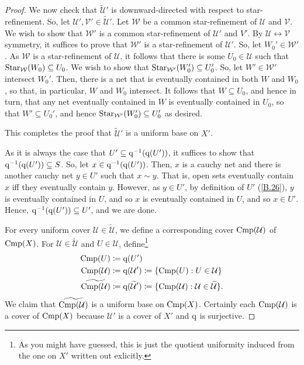 \begin{thm}[Completion]
\begin{savenotes}
\begin{proof}
We now check that $\widetilde{\mathcal{U}}'$ is downward-directed with respect to star-refinement.  So, let $\mathcal{U}',\mathcal{V}'\in \widetilde{\mathcal{U}}'$.  Let $\mathcal{W}$ be a common star-refinement of $\mathcal{U}$ and $\mathcal{V}$.  We wish to show that $\mathcal{W}'$ is a common star-refinement of $\mathcal{U}'$ and $V'$.  By $\mathcal{U}\leftrightarrow \mathcal{V}$ symmetry, it suffices to prove that $\mathcal{W}'$ is a star-refinement of $\mathcal{U}'$.  So, let $W_0'\in \mathcal{W}'$.  As $\mathcal{W}$ is a star-refinement of $\mathcal{U}$, it follows that there is some $U_0\in \mathcal{U}$ such that $\operatorname{Star} _{\mathcal{W}}(W_0)\subseteq U_0$.  We wish to show that $\operatorname{Star} _{\mathcal{W}'}(W_0')\subseteq U_0'$.  So, let $W'\in \mathcal{W}'$ intersect $W_0'$.  Then, there is a net that is eventually contained in both $W$ and $W_0$, so that, in particular, $W$ and $W_0$ intersect.  It follows that $W\subseteq U_0$, and hence in turn, that any net eventually contained in $W$ is eventually contained in $U_0$, so that $W'\subseteq U_0'$, and hence $\operatorname{Star} _{\mathcal{W}'}(W_0')\subseteq U_0'$ as desired.

This completes the proof that $\widetilde{\mathcal{U}}'$ is a uniform base on $X'$.

\label{Completion.5}
As it is always the case that $U'\subseteq \mathrm{q} ^{-1}(\mathrm{q} (U'))$, it suffices to show that $\mathrm{q} ^{-1}(\mathrm{q} (U'))\subseteq S$.  So, let $x\in \mathrm{q} ^{-1}(\mathrm{q} (U'))$.  Then, $x$ is a cauchy net and there is another cauchy net $y\in U'$ such that $x\sim y$.  That is, open sets eventually contain $x$ iff they eventually contain $y$.  However, as $y\in U'$, by definition of $U'$ (\eqref{B.26}), $y$ is eventually contained in $U$, and so $x$ is eventually contained in $U$, and so $x\in U'$.  Hence, $\mathrm{q} ^{-1}(\mathrm{q} (U'))\subseteq U'$, and we are done.

For every uniform cover $\mathcal{U}\in \widetilde{\mathcal{U}}$, we define a corresponding cover $\operatorname{Cmp} (\mathcal{U})$ of $\operatorname{Cmp} (X)$.  For $\mathcal{U}\in \widetilde{\mathcal{U}}$ and $U\in \mathcal{U}$, define\footnote{As you might have guessed, this is just the quotient uniformity induced from the one on $X'$ written out exlicitly.}
\begin{equation}
\begin{split}
\operatorname{Cmp} (U) & \coloneqq \mathrm{q} (U') \\
\operatorname{Cmp} (\mathcal{U}) & \coloneqq \mathrm{q} (\mathcal{U}')\coloneqq \{ \operatorname{Cmp} (U):U\in \mathcal{U}\} \\
\widetilde{\operatorname{Cmp} (\mathcal{U})} & \coloneqq \mathrm{q} (\widetilde{\mathcal{U}}') \coloneqq \{ \operatorname{Cmp} (\mathcal{U}):\mathcal{U}\in \widetilde{\mathcal{U}}\} .
\end{split}
\end{equation}
We claim that $\widetilde{\operatorname{Cmp} (\mathcal{U})}$ is a uniform base on $\operatorname{Cmp} (X)$.  Certainly each $\operatorname{Cmp} (\mathcal{U})$ is a cover of $\operatorname{Cmp} (X)$ because $\mathcal{U}'$ is a cover of $X'$ and $\mathrm{q}$ is surjective.


\end{proof}
\end{savenotes}
\end{thm}
